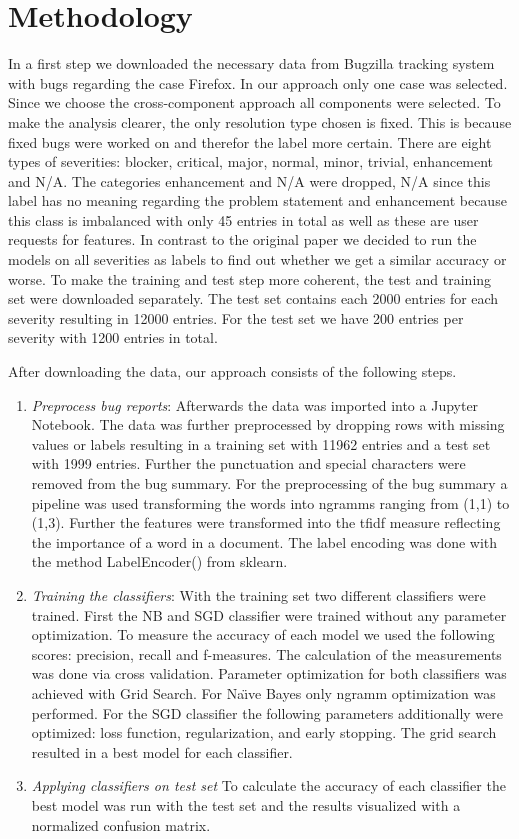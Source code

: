 \documentclass[sigconf,screen]{acmart}
\begin{document}
\section{Methodology}
In a first step we downloaded the necessary data from Bugzilla tracking system with bugs regarding the case Firefox. In our approach only one case was selected. Since we choose the cross-component approach all components were selected. To make the analysis clearer, the only resolution type chosen is fixed. This is because fixed bugs were worked on and therefor the label more certain. There are eight types of severities: blocker, critical, major, normal, minor, trivial, enhancement and N/A. The categories enhancement and N/A were dropped, N/A since this label has no meaning regarding the problem statement and enhancement because this class is imbalanced with only 45 entries in total as well as these are user requests for features. In contrast to the original paper we decided to run the models on all severities as labels to find out whether we get a similar accuracy or worse. To make the training and test step more coherent, the test and training set were downloaded separately. The test set contains each 2000 entries for each severity resulting in 12000 entries. For the test set we have 200 entries per severity with 1200 entries in total.

After downloading the data, our approach consists of the following steps.

\begin{enumerate}
	\item \textit{Preprocess bug reports}: Afterwards the data was imported into a Jupyter Notebook. The data was further preprocessed by dropping rows with missing values or labels resulting in a training set with 11962 entries and a test set with 1999 entries. Further the punctuation and special characters were removed from the bug summary. For the preprocessing of the bug summary a pipeline was used transforming the words into ngramms ranging from (1,1) to (1,3). Further the features were transformed into the tfidf measure reflecting the importance of a word in a document. The label encoding was done with the method LabelEncoder() from sklearn.
	\item \textit{Training the classifiers}: With the training set two different classifiers were trained. First the NB and SGD classifier were trained without any parameter optimization. To measure the accuracy of each model we used the following scores: precision, recall and f-measures. The calculation of the measurements was done via cross validation. Parameter optimization for both classifiers was achieved with Grid Search. For Na{\"\i}ve Bayes only ngramm optimization was performed. For the SGD classifier the following parameters additionally were optimized: loss function, regularization, and early stopping. The grid search resulted in a best model for each classifier.
	\item \textit{Applying classifiers on test set} To calculate the accuracy of each classifier the best model was run with the test set and the results visualized with a normalized confusion matrix. 
	
\end{enumerate}
\end{document}
